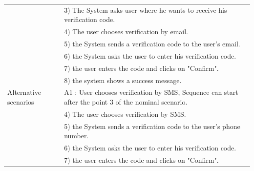 \documentclass[]{uc2pfecaneva}
\begin{document}
\begin{table}[h]
\begin{tabularx}{\textwidth}{|l|X|}
            & 3) The System asks user where he wants to receive his verification code.                                                                                             \\
            & 4) The user chooses verification by email.                                                                                                                           \\
            & 5) the System sends a verification code to the user's email.                                                                                                         \\
            & 6) the System asks the user to enter his verification code.                                                                                                          \\
            & 7) the user enters the code and clicks on "Confirm".                                                                                                                 \\
            & 8) the system shows a success message.                                                                                                                               \\ \hline
            Alternative scenarios
            & A1 : User chooses verification by SMS,  Sequence can start after the point 3 of the nominal scenario.                                                                \\
            & \hspace{4mm}4) The user chooses verification by SMS.                                                                                                               \\
            & \hspace{4mm}5) the System sends a verification code to the user's phone number.                                                                                    \\
            & \hspace{4mm}6) the System asks the user to enter his verification code.                                                                                            \\
            & \hspace{4mm}7) the user enters the code and clicks on "Confirm".                                                                                                   \\

\end{tabularx}
\end{table}
\end{document}
